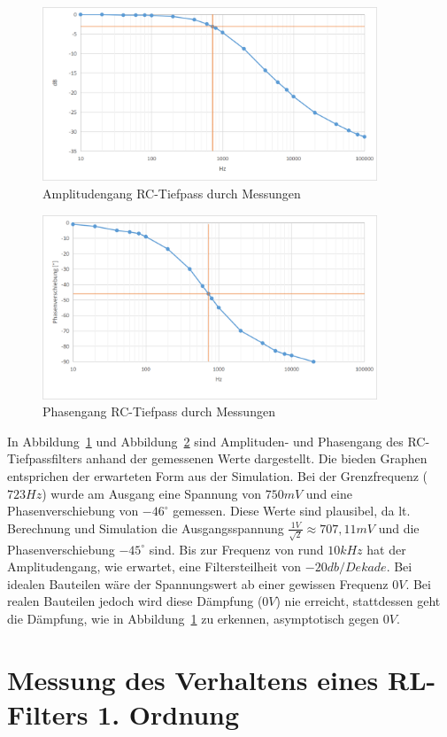 \documentclass[12pt,a4paper,titlepage]{article}
\begin{document}
\begin{figure}[H]
  \centering
  \includegraphics[width=100mm]{amplitudengang_rc_tiefpass.png}
  \caption{Amplitudengang RC-Tiefpass durch Messungen}
  \label{Figure04}
\end{figure}
\begin{figure}[H]
  \centering
  \includegraphics[width=100mm]{phasengang_rc_tiefpass.png}
  \caption{Phasengang RC-Tiefpass durch Messungen}
  \label{Figure05}
\end{figure}
\noindent In Abbildung~\ref{Figure04} und Abbildung~\ref{Figure05} sind Amplituden- und Phasengang des RC-Tiefpassfilters anhand der gemessenen Werte dargestellt. Die bieden Graphen entsprichen der erwarteten Form aus der Simulation. Bei der Grenzfrequenz ($723Hz$) wurde am Ausgang eine Spannung von $750mV$ und eine Phasenverschiebung von $-46^{\circ}$ gemessen. Diese Werte sind plausibel, da lt. Berechnung und Simulation die Ausgangsspannung $\frac{1V}{\sqrt{2}} \approx 707,11mV$ und die Phasenverschiebung $-45^{\circ}$ sind. Bis zur Frequenz von rund $10kHz$ hat der Amplitudengang, wie erwartet, eine Filtersteilheit von $-20db/Dekade$. Bei idealen Bauteilen w\"are der Spannungswert ab einer gewissen Frequenz $0 V$. Bei realen Bauteilen jedoch wird diese D\"ampfung ($0V$) nie erreicht, stattdessen geht die D\"ampfung, wie in Abbildung~\ref{Figure04} zu erkennen, asymptotisch gegen $0V$.




\section{Messung des Verhaltens eines RL-Filters 1. Ordnung}
\end{document}
